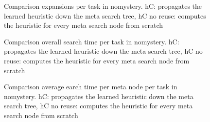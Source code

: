\newpage
\begin{figure}[ht]
\small


\caption{Comparison expansions per task in nomystery. hC: propagates the learned heuristic down the meta search tree, hC no reuse: computes the heuristic for every meta search node from scratch}
\end{figure}
\begin{figure}[ht]
\small


\caption{Comparison overall search time per task in nomystery. hC: propagates the learned heuristic down the meta search tree, hC no reuse: computes the heuristic for every meta search node from scratch}
\end{figure}

\begin{figure}[ht]
\small


\caption{Comparison average earch time per meta node per task in nomystery. hC: propagates the learned heuristic down the meta search tree, hC no reuse: computes the heuristic for every meta search node from scratch}
\end{figure}

%
%
%
%
